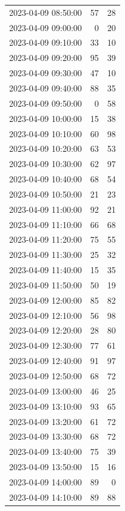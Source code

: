 \documentclass[
  letterpaper,
  DIV=11,
  numbers=noendperiod]{scrartcl}
\begin{document}
\begin{tabular}{lrr}
2023-04-09 08:50:00 &    57 &    28 \\
2023-04-09 09:00:00 &     0 &    20 \\
2023-04-09 09:10:00 &    33 &    10 \\
2023-04-09 09:20:00 &    95 &    39 \\
2023-04-09 09:30:00 &    47 &    10 \\
2023-04-09 09:40:00 &    88 &    35 \\
2023-04-09 09:50:00 &     0 &    58 \\
2023-04-09 10:00:00 &    15 &    38 \\
2023-04-09 10:10:00 &    60 &    98 \\
2023-04-09 10:20:00 &    63 &    53 \\
2023-04-09 10:30:00 &    62 &    97 \\
2023-04-09 10:40:00 &    68 &    54 \\
2023-04-09 10:50:00 &    21 &    23 \\
2023-04-09 11:00:00 &    92 &    21 \\
2023-04-09 11:10:00 &    66 &    68 \\
2023-04-09 11:20:00 &    75 &    55 \\
2023-04-09 11:30:00 &    25 &    32 \\
2023-04-09 11:40:00 &    15 &    35 \\
2023-04-09 11:50:00 &    50 &    19 \\
2023-04-09 12:00:00 &    85 &    82 \\
2023-04-09 12:10:00 &    56 &    98 \\
2023-04-09 12:20:00 &    28 &    80 \\
2023-04-09 12:30:00 &    77 &    61 \\
2023-04-09 12:40:00 &    91 &    97 \\
2023-04-09 12:50:00 &    68 &    72 \\
2023-04-09 13:00:00 &    46 &    25 \\
2023-04-09 13:10:00 &    93 &    65 \\
2023-04-09 13:20:00 &    61 &    72 \\
2023-04-09 13:30:00 &    68 &    72 \\
2023-04-09 13:40:00 &    75 &    39 \\
2023-04-09 13:50:00 &    15 &    16 \\
2023-04-09 14:00:00 &    89 &     0 \\
2023-04-09 14:10:00 &    89 &    88 \\

\end{tabular}
\end{document}
